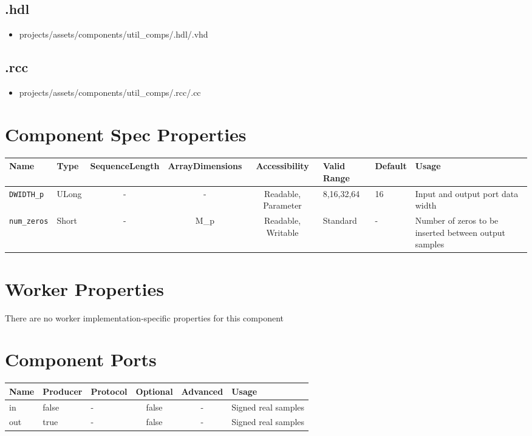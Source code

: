 \subsection*{\comp.hdl}
\begin{itemize}
	\item projects/assets/components/util\_comps/\comp.hdl/\comp.vhd
\end{itemize}
\subsection*{\comp.rcc}
\begin{itemize}
	\item projects/assets/components/util\_comps/\comp.rcc/\comp.cc
\end{itemize}
\begin{landscape}
	\section*{Component Spec Properties}
	\begin{scriptsize}
		\begin{tabular}{|p{2cm}|p{1.5cm}|c|c|c|p{1.5cm}|p{1cm}|p{7cm}|}
			\hline
			\rowcolor{blue}
			Name          		& Type  & SequenceLength & ArrayDimensions & Accessibility       & Valid Range & Default & Usage              	\\
			\hline
			\verb+DWIDTH_p+ 	& ULong & -              & -               & Readable, Parameter & 8,16,32,64  & 16      & Input and output port data width\\
			\hline
			\verb+num_zeros+  	& Short & -              & M\_p            & Readable, Writable	 & Standard    & -       & Number of zeros to be inserted between output samples \\
			\hline
		\end{tabular}
	\end{scriptsize}

	\section*{Worker Properties}
	There are no worker implementation-specific properties for this component

	\section*{Component Ports}
	\begin{scriptsize}
		\begin{tabular}{|M{2cm}|M{1.5cm}|M{4cm}|c|c|p{9cm}|}
			\hline
			\rowcolor{blue}
			Name & Producer & Protocol			& Optional & Advanced 					& Usage      			\\
			\hline
			in   & false    & -					& false    & -        					& Signed real samples  	\\
			\hline
			out  & true     & - 				& false    & -							& Signed real samples	\\
			\hline
		\end{tabular}
	\end{scriptsize}

\end{landscape}
